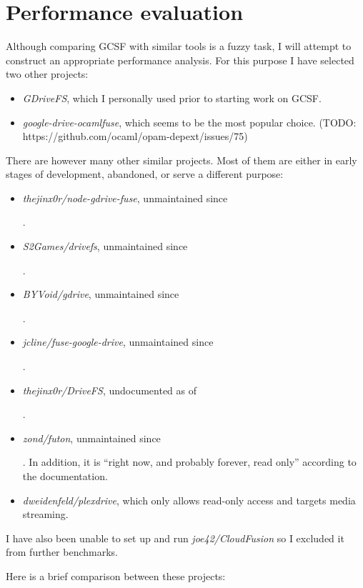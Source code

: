 \chapter{Performance evaluation}

Although comparing GCSF with similar tools is a fuzzy task, I will attempt to construct an appropriate performance analysis. For this purpose I have selected two other projects:

\begin{itemize}
  \itemsep0em
  \item \emph{GDriveFS}, which I personally used prior to starting work on GCSF.
  \item \emph{google-drive-ocamlfuse}, which seems to be the most popular choice. (TODO: https://github.com/ocaml/opam-depext/issues/75)
\end{itemize}

There are however many other similar projects. Most of them are either in early stages of development, abandoned, or serve a different purpose:

\begin{itemize}
  \itemsep0em
  \item \emph{thejinx0r/node-gdrive-fuse}, unmaintained since \date{February 2016}.
  \item \emph{S2Games/drivefs}, unmaintained since \date{June 2014}.
  \item \emph{BYVoid/gdrive}, unmaintained since \date{October 2013}.
  \item \emph{jcline/fuse-google-drive}, unmaintained since \date{September 2012}.
  \item \emph{thejinx0r/DriveFS}, undocumented as of \date{June 2018}.
  \item \emph{zond/futon}, unmaintained since \date{December 2014}. In addition, it is ``right now, and probably forever, read only'' according to the documentation.
  \item \emph{dweidenfeld/plexdrive}, which only allows read-only access and targets media streaming.
\end{itemize}

I have also been unable to set up and run \emph{joe42/CloudFusion} so I excluded it from further benchmarks.


Here is a brief comparison between these projects:

